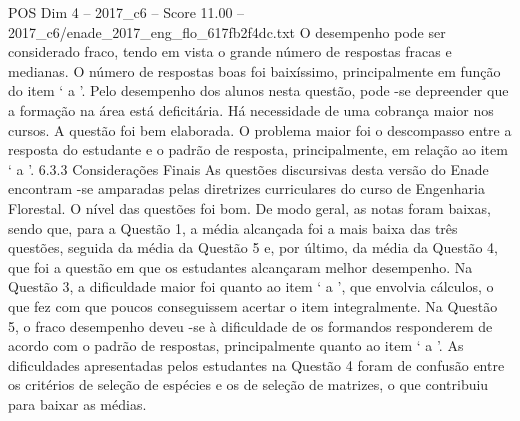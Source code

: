 \begin{textsample}{POS Dim 4 – 2017\_c6 – Score 11.00 – 2017\_c6/enade\_2017\_eng\_flo\_617fb2f4dc.txt}
O desempenho pode ser considerado fraco, tendo em vista o grande número de respostas fracas e medianas.
O número de respostas boas foi baixíssimo, principalmente em função do item ‘ a ’.
Pelo desempenho dos alunos nesta questão, pode -se depreender que a formação na área está deficitária.
Há necessidade de uma cobrança maior nos cursos.
A questão foi bem elaborada.
O problema maior foi o descompasso entre a resposta do estudante e o padrão de resposta, principalmente, em relação ao item ‘ a ’. 6.3.3 Considerações Finais As questões discursivas desta versão do Enade encontram -se amparadas pelas diretrizes curriculares do curso de Engenharia Florestal.
O nível das questões foi bom.
De modo geral, as notas foram baixas, sendo que, para a Questão 1, a média alcançada foi a mais baixa das três questões, seguida da média da Questão 5 e, por último, da média da Questão 4, que foi a questão em que os estudantes alcançaram melhor desempenho.
Na Questão 3, a dificuldade maior foi quanto ao item ‘ a ’, que envolvia cálculos, o que fez com que poucos conseguissem acertar o item integralmente.
Na Questão 5, o fraco desempenho deveu -se à dificuldade de os formandos responderem de acordo com o padrão de respostas, principalmente quanto ao item ‘ a ’.
As dificuldades apresentadas pelos estudantes na Questão 4 foram de confusão entre os critérios de seleção de espécies e os de seleção de matrizes, o que contribuiu para baixar as médias.

\end{textsample}
